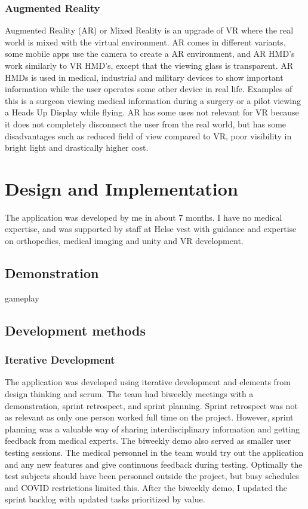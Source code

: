\documentclass[a4paper]{report}
\begin{document}
\subsection{ Augmented Reality }
Augmented Reality (AR) or Mixed Reality is an upgrade of VR where the real world is mixed with the virtual environment\cite{hackett_three-dimensional_2016}. AR comes in different variants, some mobile apps use the camera to create a AR environment, and AR HMD's work similarly to VR HMD's, except that the viewing glass is transparent.
AR HMDs is used in medical, industrial and military devices to show important information while the user operates some other device in real life. Examples of this is a surgeon viewing medical information during a surgery or a pilot viewing a Heads Up Display while flying\cite{mihelj_virtual_2014}.
AR has some uses not relevant for VR because it does not completely disconnect the user from the real world, but has some disadvantages such as reduced field of view compared to VR, poor visibility in bright light\cite{hackett_three-dimensional_2016} and drastically higher cost\cite{medical_holodeck_medicalholodeck_nodate}.


\chapter{Design and Implementation}\label{Design and Implementation}

The application was developed by me in about 7 months. I have no medical expertise, and was supported by staff at Helse vest with guidance and expertise on orthopedics, medical imaging and unity and VR development.

\section{Demonstration}\label{demonstration}
gameplay

\section{Development methods}

\subsection{Iterative Development}
The application was developed using iterative development and elements from design thinking and scrum.
The team had biweekly meetings with a demonstration, sprint retrospect, and sprint planning. Sprint retrospect was not as relevant as only one person worked full time on the project. However, sprint planning was a valuable way of sharing interdisciplinary information and getting feedback from medical experts.
The biweekly demo also served as smaller user testing sessions. The medical personnel in the team would try out the application and any new features and give continuous feedback during testing. Optimally the test subjects should have been personnel outside the project, but busy schedules and COVID restrictions limited this.
After the biweekly demo, I updated the sprint backlog with updated tasks prioritized by value.
\end{document}
